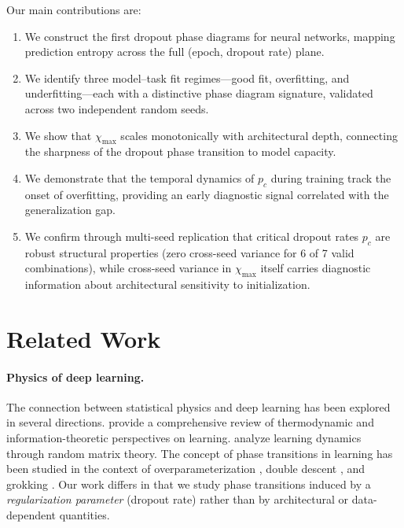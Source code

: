\documentclass{article}
\begin{document}
Our main contributions are:
\begin{enumerate}
    \item We construct the first dropout phase diagrams for neural networks, mapping prediction entropy across the full (epoch, dropout rate) plane.
    \item We identify three model--task fit regimes---good fit, overfitting, and underfitting---each with a distinctive phase diagram signature, validated across two independent random seeds.
    \item We show that $\chi_{\max}$ scales monotonically with architectural depth, connecting the sharpness of the dropout phase transition to model capacity.
    \item We demonstrate that the temporal dynamics of $p_c$ during training track the onset of overfitting, providing an early diagnostic signal correlated with the generalization gap.
    \item We confirm through multi-seed replication that critical dropout rates $p_c$ are robust structural properties (zero cross-seed variance for 6 of 7 valid combinations), while cross-seed variance in $\chi_{\max}$ itself carries diagnostic information about architectural sensitivity to initialization.
\end{enumerate}

\section{Related Work}
\label{sec:related}

\paragraph{Physics of deep learning.} The connection between statistical physics and deep learning has been explored in several directions. \citet{bahri2020statistical} provide a comprehensive review of thermodynamic and information-theoretic perspectives on learning. \citet{saxe2013exact} analyze learning dynamics through random matrix theory. The concept of phase transitions in learning has been studied in the context of overparameterization \citep{belkin2019reconciling}, double descent \citep{nakkiran2021deep}, and grokking \citep{power2022grokking}. Our work differs in that we study phase transitions induced by a \emph{regularization parameter} (dropout rate) rather than by architectural or data-dependent quantities.
\end{document}
